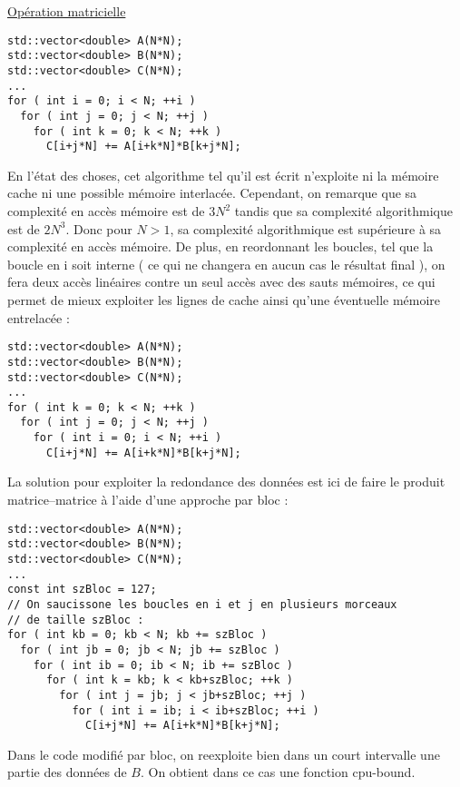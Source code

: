 \documentclass[fleqn,11pt]{article}
\begin{document}
\underline{Opération matricielle}

\begin{lstlisting}
std::vector<double> A(N*N);
std::vector<double> B(N*N);
std::vector<double> C(N*N);
...
for ( int i = 0; i < N; ++i )
  for ( int j = 0; j < N; ++j )
    for ( int k = 0; k < N; ++k )
      C[i+j*N] += A[i+k*N]*B[k+j*N];
\end{lstlisting}

En l'état des choses, cet algorithme tel qu'il est écrit n'exploite ni la mémoire cache ni une possible mémoire interlacée.
Cependant, on remarque que sa complexité en accès mémoire est de $3N^{2}$ tandis que sa complexité algorithmique est
de $2N^{3}$. Donc pour $N>1$, sa complexité algorithmique est supérieure à sa complexité en accès mémoire. De plus, en reordonnant
les boucles, tel que la boucle en i soit interne ( ce qui ne changera en aucun cas le résultat final ), on fera deux accès linéaires
contre un seul accès avec des sauts mémoires, ce qui permet de mieux exploiter les lignes de cache ainsi qu'une éventuelle
mémoire entrelacée :

\begin{lstlisting}
std::vector<double> A(N*N);
std::vector<double> B(N*N);
std::vector<double> C(N*N);
...
for ( int k = 0; k < N; ++k )
  for ( int j = 0; j < N; ++j )
    for ( int i = 0; i < N; ++i )
      C[i+j*N] += A[i+k*N]*B[k+j*N];
\end{lstlisting}


La solution pour exploiter la redondance des données est ici de faire le produit matrice--matrice à l'aide 
d'une approche par bloc :

\begin{lstlisting}
std::vector<double> A(N*N);
std::vector<double> B(N*N);
std::vector<double> C(N*N);
...
const int szBloc = 127;
// On saucissone les boucles en i et j en plusieurs morceaux 
// de taille szBloc :
for ( int kb = 0; kb < N; kb += szBloc )
  for ( int jb = 0; jb < N; jb += szBloc )
    for ( int ib = 0; ib < N; ib += szBloc )
      for ( int k = kb; k < kb+szBloc; ++k )
        for ( int j = jb; j < jb+szBloc; ++j )
          for ( int i = ib; i < ib+szBloc; ++i )
            C[i+j*N] += A[i+k*N]*B[k+j*N];
\end{lstlisting}

Dans le code modifié par bloc, on reexploite bien dans un court intervalle une partie des données
de $B$. On obtient dans ce cas une fonction cpu-bound.
\end{document}
